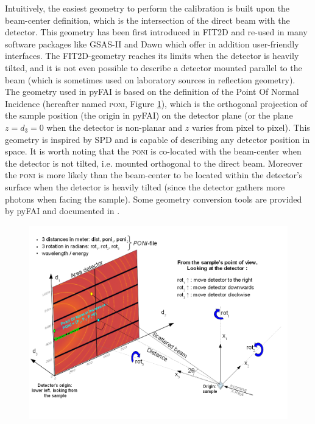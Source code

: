 \documentclass[preprint]{iucr}              %
\let\caption\foo
\begin{document}
Intuitively, the easiest geometry to perform the calibration is built upon 
the beam-center definition, which is the intersection of the direct beam with the detector. 
This geometry has been first introduced in FIT2D \cite{Hammersley:fs5107} 
and re-used in many software packages like GSAS-II \cite{Toby:aj5212} and 
Dawn \cite{Filik:vg5068} which offer in addition user-friendly interfaces.
The FIT2D-geometry reaches its limits when the detector is heavily tilted, and it is not 
even possible to describe a detector mounted parallel to the beam 
(which is sometimes used on laboratory sources in reflection geometry).
The geometry used in pyFAI is based on the definition of the Point Of Normal Incidence 
(hereafter named \textsc{poni}, Figure \ref{poni}), which is 
the orthogonal projection of the sample position (the origin in pyFAI) on the detector plane (or
the plane $z=d_3=0$ when the detector is non-planar and $z$ varies from pixel to pixel).
This geometry is inspired by SPD \cite{Boesecke:aj6013} and is capable of describing any 
detector position in space. 
It is worth noting that the \textsc{poni} is co-located with the beam-center when the 
detector is not tilted, i.e. mounted orthogonal to the direct beam. 
Moreover the \textsc{poni} is more likely than the beam-center to be located within the detector's 
surface when the detector is heavily tilted (since the detector gathers more photons when facing the sample). 
Some geometry conversion tools are provided by pyFAI and documented in .

\begin{figure}
\label{poni}
\begin{center}
\includegraphics[width=15cm]{images/PONI}
\caption{Geometry used in pyFAI.}
\end{center}
\end{figure}
\end{document}
